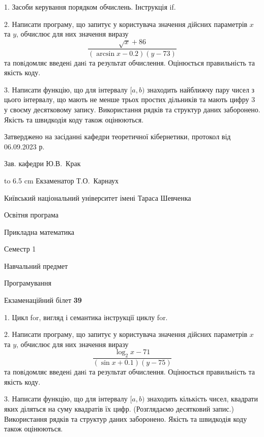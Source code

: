 \documentclass[12pt, ukrainian]{article}
\begin{document}
{%
1. Засоби керування порядком обчислень. Інструкція if.%
\par
2. Написати програму, що запитує у користувача значення дійсних параметрів $x$ та $y$, обчислює для них значення виразу 
$$\frac{\sqrt x + 86}{(\arcsin x - 0.2) (y - 73)}$$ 
та повiдомляє введенi данi та результат обчислення.
 Оцінюється правильність та якість коду.

\par
3. Написати функцію, що для інтервалу $[a, b)$ знаходить найближчу пару чисел з цього інтервалу, що мають не менше трьох простих дільників та мають цифру 3 у своєму десятковому запису.  Використання рядків та структур даних заборонено. Якість та швидкодія коду також оцінюються. 

}
{\smallskip\smallskip \begin {scriptsize} Затверджено на засіданні кафедри теоретичної кібернетики, протокол   від   06.09.2023 р.\par\smallskip\smallskip\smallskip\smallskip
{\parbox {6.5 cm} {Зав. кафедри \dotfill Ю.В.~Крак}}\hspace {0.7cm} {\hbox to 6.5 cm { Екзаменатор \dotfill Т.О.~Карнаух}} \end{scriptsize}}
\vspace{0.9cm}
{{\begin {scriptsize}\par
{ \center  Київський національний університет імені Тараса Шевченка \par}
{\parbox {5 cm}{Освітня програма \hfill}{\parbox {7 cm}{Прикладна математика\hfill}}\parbox {6 cm}{\hfill Семестр 1}}\par
{\parbox {5 cm} {Навчальний предмет \hfill}\parbox {7 cm}{Програмування \hfill}\parbox {6cm}{\hfill}\par}\vspace{-15pt} \end{scriptsize}}{\center Екзаменаційний білет \No \textbf { 39 }\par}}
{%
1. Цикл for, вигляд і семантика інструкції циклу for.%
\par
2. Написати програму, що запитує у користувача значення дійсних параметрів $x$ та $y$, обчислює для них значення виразу 
$$\frac{\log_{2} x - 71}{(\sin x + 0.1) (y - 75)}$$ 
та повiдомляє введенi данi та результат обчислення.
 Оцінюється правильність та якість коду.

\par
3. Написати функцію, що для інтервалу $[a, b)$ знаходить кількість чисел, квадрати яких діляться на суму квадратів їх цифр. (Розглядаємо десятковий запис.)  Використання рядків та структур даних заборонено. Якість та швидкодія коду також оцінюються. 

}
\end{document}
